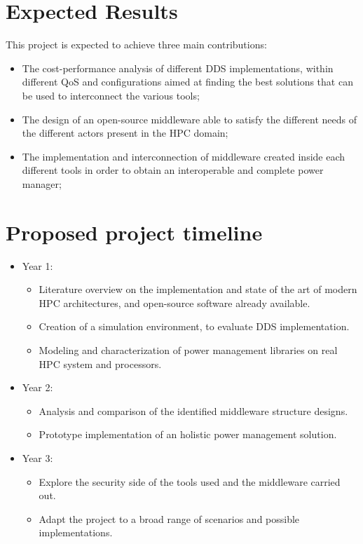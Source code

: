 \section{Expected Results}
This project is expected to achieve three main contributions:
\begin{itemize}
    \item The cost-performance analysis of different DDS implementations, within different QoS and configurations aimed at finding the best solutions that can be used to interconnect the various tools;

    \item The design of an open-source middleware able to satisfy the different needs of the different actors present in the HPC domain;

    \item The implementation and interconnection of middleware created inside each different tools in order to obtain an interoperable and complete power manager;
\end{itemize}

\section{Proposed project timeline}
\begin{itemize}
\item{Year 1:
\begin{itemize}
    \item Literature overview on the implementation and state of the art of modern HPC architectures, and open-source software already available.
    \item Creation of a simulation environment, to evaluate DDS implementation.
    \item Modeling and characterization of power management libraries on real HPC system and processors.
\end{itemize}}
\item{Year 2:
\begin{itemize}
    \item Analysis and comparison of the identified middleware structure designs.
    \item Prototype implementation of an holistic power management solution.
\end{itemize}}
\item{Year 3:
\begin{itemize}
    \item Explore the security side of the tools used and the middleware carried out.
    \item Adapt the project to a broad range of scenarios and possible implementations.
\end{itemize}}
\end{itemize}

